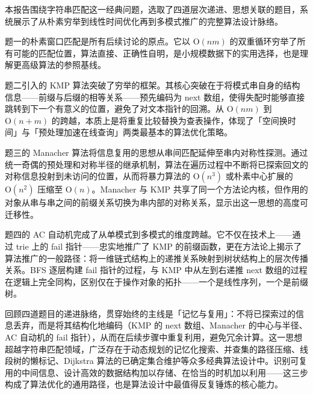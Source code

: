 \documentclass[12pt, a4paper]{academics}
\begin{document}
本报告围绕字符串匹配这一经典问题，选取了四道层次递进、思想关联的题目，系统展示了从朴素穷举到线性时间优化再到多模式推广的完整算法设计脉络。

题一的朴素窗口匹配是所有后续讨论的原点。它以 $\mathrm{O}(nm)$ 的双重循环穷举了所有可能的匹配位置，算法直接、正确性自明，是小规模数据下的实用选择，也是理解更高级算法的参照基线。

题二引入的 KMP 算法突破了穷举的框架。其核心突破在于将模式串自身的结构信息——前缀与后缀的相等关系——预先编码为 next 数组，使得失配时能够直接跳转到下一个有意义的位置，避免了对文本指针的回溯。从 $\mathrm{O}(nm)$ 到 $\mathrm{O}(n + m)$ 的跨越，本质上是将重复比较替换为查表操作，体现了「空间换时间」与「预处理加速在线查询」两类最基本的算法优化策略。

题三的 Manacher 算法将信息复用的思想从串间匹配延伸至串内对称性探测。通过统一奇偶的预处理和对称半径的继承机制，算法在遍历过程中不断将已探索回文的对称信息投射到未访问的位置，从而将暴力算法的 $\mathrm{O}(n^3)$ 或朴素中心扩展的 $\mathrm{O}(n^2)$ 压缩至 $\mathrm{O}(n)$。Manacher 与 KMP 共享了同一个方法论内核，但作用的对象从串与串之间的前缀关系切换为串内部的对称关系，显示出这一思想的高度可迁移性。

题四的 AC 自动机完成了从单模式到多模式的维度跨越。它不仅在技术上——通过 trie 上的 fail 指针——忠实地推广了 KMP 的前缀函数，更在方法论上揭示了算法推广的一般路径：将一维链式结构上的递推关系映射到树状结构上的层次传播关系。BFS 逐层构建 fail 指针的过程，与 KMP 中从左到右递推 next 数组的过程在逻辑上完全同构，区别仅在于操作对象的拓扑——一个是线性序列，一个是前缀树。

回顾四道题目的递进脉络，贯穿始终的主线是「记忆与复用」：不将已探索过的信息丢弃，而是将其结构化地编码（KMP 的 next 数组、Manacher 的中心与半径、AC 自动机的 fail 指针），从而在后续步骤中重复利用，避免冗余计算。这一思想超越字符串匹配领域，广泛存在于动态规划的记忆化搜索、并查集的路径压缩、线段树的懒标记、Dijkstra 算法的已确定集合维护等众多经典算法设计中。识别可复用的中间信息、设计高效的数据结构加以存储、在恰当的时机加以利用——这三步构成了算法优化的通用路径，也是算法设计中最值得反复锤炼的核心能力。
\end{document}
